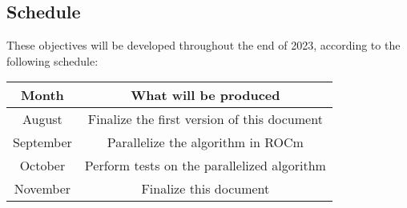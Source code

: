\subsection{Schedule} \label{Schedule}

These objectives will be developed throughout the end of 2023, according to the
following schedule:

\begin{center}
    \begin{tabular}{|c|c|}
        \hline
        Month & What will be produced \\
        \hline
        August & Finalize the first version of this document \\
        \hline
        September & Parallelize the algorithm in ROCm \\
        \hline
        October & Perform tests on the parallelized algorithm \\
        \hline
        November & Finalize this document \\
        \hline
    \end{tabular}
\end{center}
